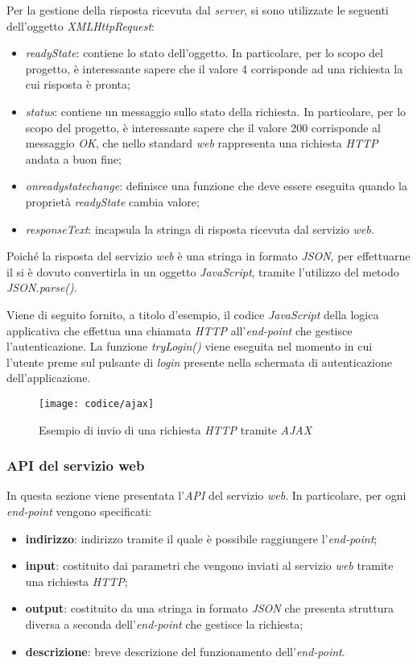 Per la gestione della risposta ricevuta dal \textit{server}, si sono utilizzate le seguenti  dell'oggetto \textit{XMLHttpRequest}:
\begin{itemize}
	\item \textit{readyState}: contiene lo stato dell'oggetto. In particolare, per lo scopo del progetto, è interessante sapere che il valore 4 corrisponde ad una richiesta la cui risposta è pronta;
	\item  \textit{status}: contiene un messaggio sullo stato della richiesta. In particolare, per lo scopo del progetto, è interessante sapere che il valore 200 corrisponde al messaggio \textit{OK}, che nello standard \textit{web} rappresenta una richiesta \textit{HTTP} andata a buon fine;
	\item \textit{onreadystatechange}: definisce una funzione che deve essere eseguita quando la proprietà \textit{readyState} cambia valore;
	\item \textit{responseText}: incapsula la stringa di risposta ricevuta dal servizio \textit{web}. 
\end{itemize} 
Poiché la risposta del servizio \textit{web} è una stringa in formato \textit{JSON}, per effettuarne il  si è dovuto convertirla in un oggetto \textit{JavaScript}, tramite l'utilizzo del metodo \textit{JSON.parse()}.

Viene di seguito fornito, a titolo d'esempio, il codice \textit{JavaScript} della logica applicativa che effettua una chiamata \textit{HTTP} all'\textit{end-point} che gestisce l'autenticazione. La funzione \textit{tryLogin()} viene eseguita nel momento in cui l'utente preme sul pulsante di \textit{login} presente nella schermata di autenticazione dell'applicazione.

\newpage

\begin{figure}[!h] 
    \centering 
    \texttt{[image: codice/ajax]} 
    \caption{Esempio di invio di una richiesta \textit{HTTP} tramite \textit{AJAX}}
\end{figure}

\subsubsection{API del servizio web} \label{api}

In questa sezione viene presentata l'\textit{API} del servizio \textit{web}. In particolare, per ogni \textit{end-point} vengono specificati:
\begin{itemize}
	\item \textbf{indirizzo}: indirizzo tramite il quale è possibile raggiungere l'\textit{end-point};
	\item \textbf{input}: costituito dai parametri che vengono inviati al servizio \textit{web} tramite una richiesta \textit{HTTP};
	\item \textbf{output}: costituito da una stringa in formato \textit{JSON} che presenta struttura diversa a seconda dell'\textit{end-point} che gestisce la richiesta;
	\item \textbf{descrizione}: breve descrizione del funzionamento dell'\textit{end-point}.
\end{itemize}

